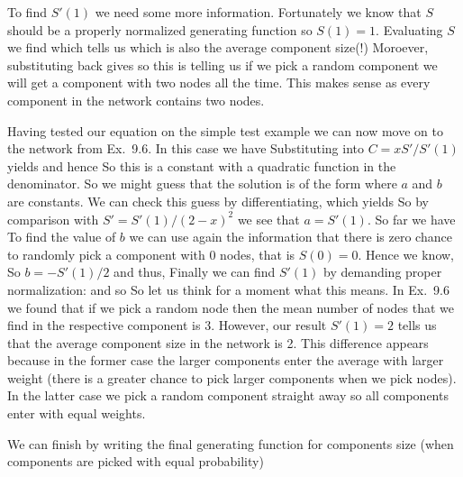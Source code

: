 To find $S'(1)$ we need some more information. Fortunately we know that  
$S$ should be a properly normalized generating function so $S(1)=1$. Evaluating $S$ we find
which tells us
which is also the average component size(!) Moroever, substituting back gives  
so this is telling us if we pick a random component we will get a component with two nodes all the time. This makes sense as every component in the network contains two nodes. 

Having tested our equation on the simple test example we can now move on to the network from Ex.~9.6. In this case we have 
Substituting into $C=xS'/S'(1)$ yields
and hence 
So this is a constant with a quadratic function in the denominator. So we might guess that the solution is of the form 
where $a$ and $b$ are constants. We can check this guess by differentiating, which yields
So by comparison with $S'=S'(1)/(2-x)^2$ we see that $a=S'(1)$. So far we have 
To find the value of $b$ we can use again the information that there is zero chance to randomly pick a component with 0 nodes, that is $S(0)=0$. 
Hence we know,
So $b=-S'(1)/2$ and thus,
Finally we can find $S'(1)$ by demanding proper normalization:
and so 
So let us think for a moment what this means. In Ex.~9.6 we found that if we pick a random node then the mean number of nodes that we find in the respective component is 3. However, our result $S'(1)=2$ tells us that the average component size in the network is 2. This difference appears because in the former case the larger components enter the average with larger weight (there is a greater chance to pick larger components when we pick nodes). In the latter case we pick a random component straight away so all components enter with equal weights.  

We can finish by writing the final generating function for components size (when components are picked with equal probability)

